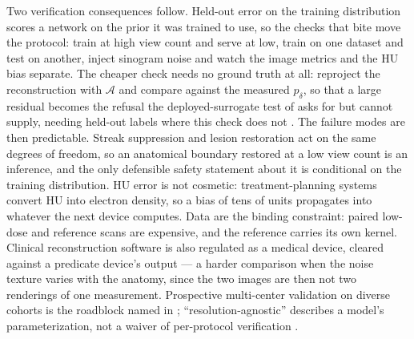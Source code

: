 Two verification consequences follow. Held-out error on the training
distribution scores a network on the prior it was trained to use, so the checks
that bite move the protocol: train at high view count and serve at low, train on
one dataset and test on another, inject sinogram noise and watch the image
metrics and the HU bias separate. The cheaper check needs no ground truth at all:
reproject the reconstruction with $\mathcal{A}$ and compare against the measured
$p_\delta$, so that a large residual becomes the refusal the deployed-surrogate
test of  asks for
but cannot supply, needing held-out labels where this check does not
. The failure modes are then
predictable. Streak suppression and lesion restoration act on the same degrees
of freedom, so an anatomical boundary restored at a low view count is an
inference, and the only defensible safety statement
about it is conditional on the training distribution. HU error is not cosmetic:
treatment-planning systems convert HU into electron density, so a bias of tens of
units propagates into whatever the next device computes. Data are the binding
constraint: paired low-dose and reference scans are expensive, and the reference
carries its own kernel. Clinical reconstruction software is also
regulated as a medical device, cleared against a predicate device's output --- a
harder comparison when the noise texture varies with the anatomy, since the two
images are then not two renderings of one measurement.
Prospective multi-center validation on diverse cohorts is the roadblock named in
;
``resolution-agnostic'' describes a model's parameterization, not a waiver of
per-protocol verification .

